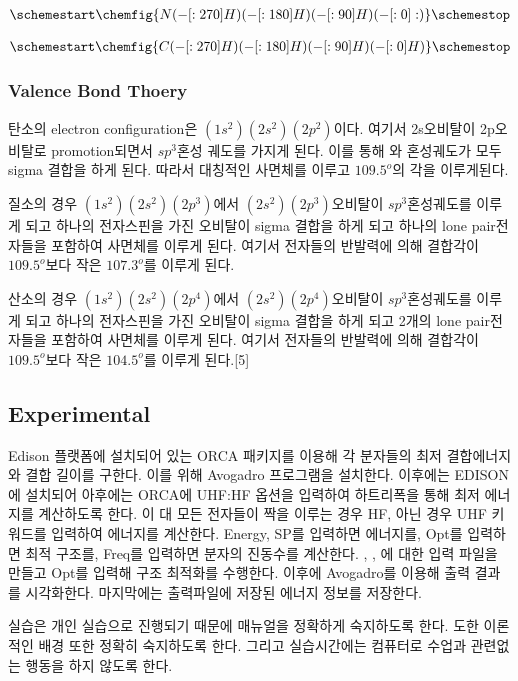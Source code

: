 \documentclass[%
 reprint,
 amsmath,amssymb,
 aps,
]{revtex4-2}
\begin{document}
\begin{align}
	\schemestart
		\chemfig{N(-[:270]H)(-[:180]H)(-[:90]H)(-[:0]:)}
	\schemestop
\end{align}

\begin{align}
	\schemestart
		\chemfig{C(-[:270]H)(-[:180]H)(-[:90]H)(-[:0]H)}
	\schemestop
\end{align}
\subsubsection{\label{sec:level2}Valence Bond Thoery}
탄소의 electron configuration은 $(1s^{2})(2s^{2})(2p^{2})$이다. 여기서 2s오비탈이 2p오비탈로 promotion되면서 $sp^{3}$혼성 궤도를 가지게 된다. 이를 통해 와 혼성궤도가 모두 sigma 결합을 하게 된다. 따라서 대칭적인 사면체를 이루고 $109.5^{o}$의 각을 이루게된다.

질소의 경우 $(1s^{2})(2s^{2})(2p^{3})$에서 $(2s^{2})(2p^{3})$오비탈이 $sp^{3}$혼성궤도를 이루게 되고 하나의 전자스핀을 가진 오비탈이  sigma 결합을 하게 되고 하나의 lone pair전자들을 포함하여 사면체를 이루게 된다. 여기서 전자들의 반발력에 의해 결합각이 $109.5^{o}$보다 작은 $107.3^{o}$를 이루게 된다.

산소의 경우 $(1s^{2})(2s^{2})(2p^{4})$에서 $(2s^{2})(2p^{4})$오비탈이 $sp^{3}$혼성궤도를 이루게 되고 하나의 전자스핀을 가진 오비탈이  sigma 결합을 하게 되고 2개의  lone pair전자들을 포함하여 사면체를 이루게 된다. 여기서 전자들의 반발력에 의해 결합각이 $109.5^{o}$보다 작은 $104.5^{o}$를 이루게 된다.[5]


\subsection{\label{sec:level2}Experimental}
Edison 플랫폼에 설치되어 있는 ORCA 패키지를 이용해 각 분자들의 최저 결합에너지와 결합 길이를 구한다. 이를 위해 Avogadro 프로그램을 설치한다. 이후에는 EDISON에 설치되어 아후에는 ORCA에 UHF:HF 옵션을 입력하여 하트리폭을 통해 최저 에너지를 계산하도록 한다. 이 대 모든 전자들이 짝을 이루는 경우 HF, 아닌 경우 UHF 키워드를 입력하여 에너지를 계산한다. Energy, SP를 입력하면 에너지를, Opt를 입력하면 최적 구조를, Freq를 입력하면 분자의 진동수를 계산한다. , , 에 대한 입력 파일을 만들고 Opt를 입력해 구조 최적화를 수행한다. 이후에 Avogadro를 이용해 출력 결과를 시각화한다. 마지막에는 출력파일에 저장된 에너지 정보를 저장한다.

실습은 개인 실습으로 진행되기 때문에 매뉴얼을 정확하게 숙지하도록 한다. 도한 이론적인 배경 또한 정확히 숙지하도록 한다. 그리고 실습시간에는 컴퓨터로 수업과 관련없는 행동을 하지 않도록 한다.
\end{document}

